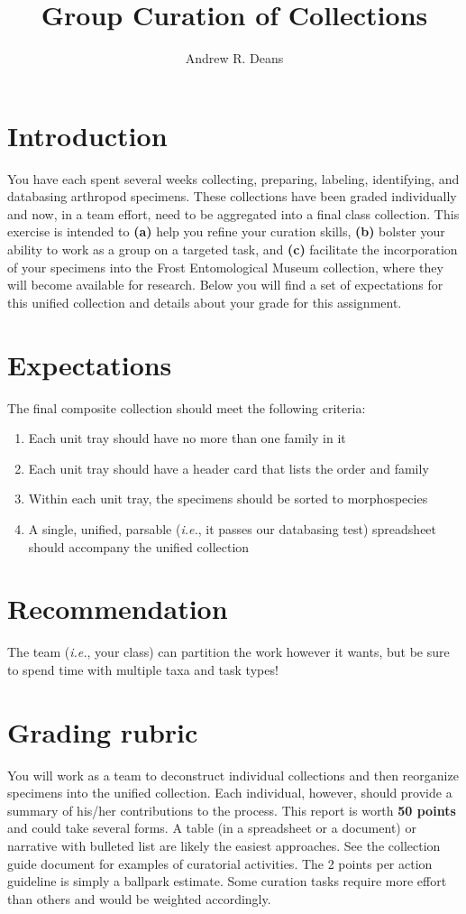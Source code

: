 \documentclass[letterpaper, 11pt]{article}
\title{Group Curation of Collections}
\author{Andrew R. Deans}
\begin{document}
\cleanlookdateon %
\maketitle
\thispagestyle{fancy}
\section*{Introduction}
You have each spent several weeks collecting, preparing, labeling, identifying, and databasing arthropod specimens. These collections have been graded individually and now, in a team effort, need to be aggregated into a final class collection. This exercise is intended to \textbf{(a)} help you refine your curation skills, \textbf{(b)} bolster your ability to work as a group on a targeted task, and \textbf{(c)} facilitate the incorporation of your specimens into the Frost Entomological Museum collection, where they will become available for research. Below you will find a set of expectations for this unified collection and details about your grade for this assignment.

\section*{Expectations}
The final composite collection should meet the following criteria:
\begin{enumerate}
\item Each unit tray should have no more than one family in it
\item Each unit tray should have a header card that lists the order and family
\item Within each unit tray, the specimens should be sorted to morphospecies
\item A single, unified, parsable (\textit{i.e.}, it passes our databasing test) spreadsheet should accompany the unified collection
\end{enumerate}

\section*{Recommendation}
The team (\textit{i.e.}, your class) can partition the work however it wants, but be sure to spend time with multiple taxa and task types!

\section*{Grading rubric}
You will work as a team to deconstruct individual collections and then reorganize specimens into the unified collection. Each individual, however, should provide a summary of his/her contributions to the process. This report is worth \textbf{50 points} and could take several forms. A table (in a spreadsheet or a document) or narrative with bulleted list are likely the easiest approaches. See the collection guide document for examples of curatorial activities. The 2 points per action guideline is simply a ballpark estimate. Some curation tasks require more effort than others and would be weighted accordingly.
  
\end{document}

